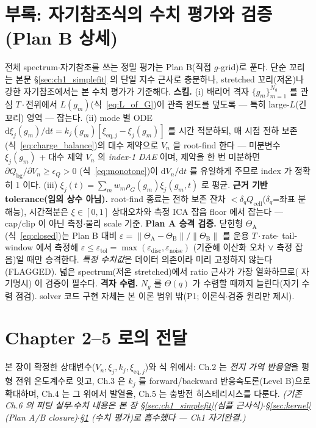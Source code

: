 \documentclass[11pt,a4paper]{article}
\newcommand{\dd}{\mathrm{d}}
\newcommand{\eq}{\mathrm{eq}}
\newcommand{\bg}{\mathrm{bg}}
\newcommand{\cell}{\mathrm{cell}}
\begin{document}
\section{부록: 자기참조식의 수치 평가와 검증 (Plan B 상세)}\label{sec:ch1_numeric}
전체 spectrum$\cdot$자기참조를 쓰는 정밀 평가는 Plan B(직접 $g$-grid)로 푼다. 단순 꼬리는 본문
\S\ref{sec:ch1_simplefit} 의 단일 지수 근사로 충분하나, stretched 꼬리(저온)나 강한 자기참조에서는 본 수치
평가가 기준해다.
\textbf{스킴.} (i) 배리어 격자 $\{g_m\}_{m=1}^{N_g}$ 를 관심 $T\cdot$전위에서 $L(g_m)$(식~\eqref{eq:L_of_G})이
관측 윈도를 덮도록 — 특히 large-$L$(긴 꼬리) 영역 — 잡는다. (ii) mode 별 ODE
$\dd\xi_j(g_m)/\dd t=k_j(g_m)[\xi_{\eq,j}-\xi_j(g_m)]$ 를 시간 적분하되, 매 시점 전하 보존
(식~\eqref{eq:charge_balance})의 대수 제약으로 $V_n$ 을 root-find 한다 — 미분변수 $\xi_j(g_m)$ + 대수 제약
$V_n$ 의 \emph{index-1 DAE} 이며, 제약을 한 번 미분하면 $\partial Q_\bg/\partial V_n\ge\epsilon_Q>0$
(식~\eqref{eq:monotone})이 $\dd V_n/\dd t$ 를 유일하게 주므로 index 가 정확히 1 이다. (iii)
$\xi_j(t)=\sum_m w_m\rho_G(g_m)\xi_j(g_m,t)$ 로 평균.
\textbf{근거 기반 tolerance(임의 상수 아님).} root-find 종료는 전하 보존 잔차 $<\delta_q Q_\cell$($\delta_q$=좌표
분해능), 시간적분은 $\xi\in[0,1]$ 상대오차와 측정 ICA 잡음 floor 에서 잡는다 — cap/clip 이 아닌 측정$\cdot$물리
scale 기준.
\textbf{Plan A 승격 검증.} 닫힌형 $\Theta_\mathrm A$(식~\eqref{eq:closed})는 Plan B 대비
$\varepsilon=\lVert\Theta_\mathrm A-\Theta_\mathrm B\rVert/\lVert\Theta_\mathrm B\rVert$ 를 운용 $T\cdot$rate$\cdot$
tail-window 에서 측정해 $\varepsilon\le\varepsilon_{\mathrm{tol}}=\max(\varepsilon_{\mathrm{disc}},\varepsilon_{\mathrm{noise}})$
(기준해 이산화 오차 $\vee$ 측정 잡음)일 때만 승격한다. \emph{특정 수치값}은 데이터 의존이라 미리 고정하지 않는다(FLAGGED). 넓은
spectrum(저온 stretched)에서 ratio 근사가 가장 열화하므로(\cite{jcp2017} 자기명시) 이 검증이 필수다.
\textbf{격자 수렴.} $N_g$ 를 $\Theta(q)$ 가 수렴할 때까지 늘린다(자기 수렴 점검). solver 코드 구현 자체는 본
이론 범위 밖(P1; 이론식$\cdot$검증 원리만 제시).

\section*{Chapter 2--5 로의 전달}
본 장이 확정한 상태변수($V_n,\xi_j,k_j,\xi_{\eq,j}$)와 식 위에서: Ch.2 는 \emph{전지 가역 반응열}을 평형
전위 온도계수로 잇고, Ch.3 은 $k_j$ 를 forward/backward 반응속도론(Level B)으로 확대하며, Ch.4 는 그 위에서
발열을, Ch.5 는 충방전 히스테리시스를 다룬다. \emph{(기존 Ch.6 의 피팅 실무$\cdot$수치 내용은 본 장
\S\ref{sec:ch1_simplefit}(심플 근사식)$\cdot$\S\ref{sec:kernel}(Plan A/B closure)$\cdot$\S\ref{sec:ch1_numeric}
(수치 평가)로 흡수했다 — Ch1 자기완결.)}
\end{document}
